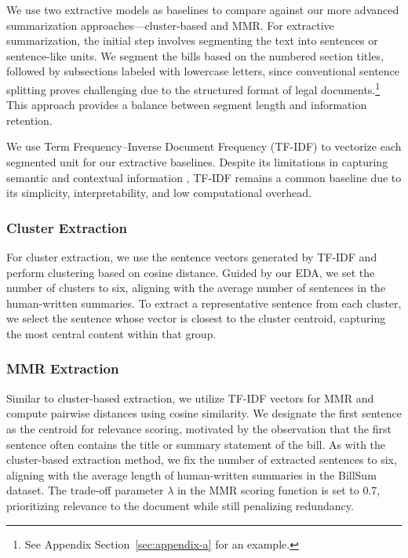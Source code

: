 \documentclass[11pt]{article}
\begin{document}
We use two extractive models as baselines to compare against our more advanced summarization approaches—cluster-based and MMR. For extractive summarization, the initial step involves segmenting the text into sentences or sentence-like units. We segment the bills based on the numbered section titles, followed by subsections labeled with lowercase letters, since conventional sentence splitting proves challenging due to the structured format of legal documents.\footnote{See Appendix Section~\ref{sec:appendix-a} for an example.} This approach provides a balance between segment length and information retention.

\indent We use Term Frequency–Inverse Document Frequency (TF-IDF) to vectorize each segmented unit for our extractive baselines. Despite its limitations in capturing semantic and contextual information \citep{9397119}, TF-IDF remains a common baseline due to its simplicity, interpretability, and low computational overhead.

\subsubsection{Cluster Extraction}

For cluster extraction, we use the sentence vectors generated by TF-IDF and perform clustering based on cosine distance. Guided by our EDA, we set the number of clusters to six, aligning with the average number of sentences in the human-written summaries. To extract a representative sentence from each cluster, we select the sentence whose vector is closest to the cluster centroid, capturing the most central content within that group.

\subsubsection{MMR Extraction}

Similar to cluster-based extraction, we utilize TF-IDF vectors for MMR and compute pairwise distances using cosine similarity. We designate the first sentence as the centroid for relevance scoring, motivated by the observation that the first sentence often contains the title or summary statement of the bill. As with the cluster-based extraction method, we fix the number of extracted sentences to six, aligning with the average length of human-written summaries in the BillSum dataset. The trade-off parameter $\lambda$ in the MMR scoring function is set to 0.7, prioritizing relevance to the document while still penalizing redundancy.
\end{document}
